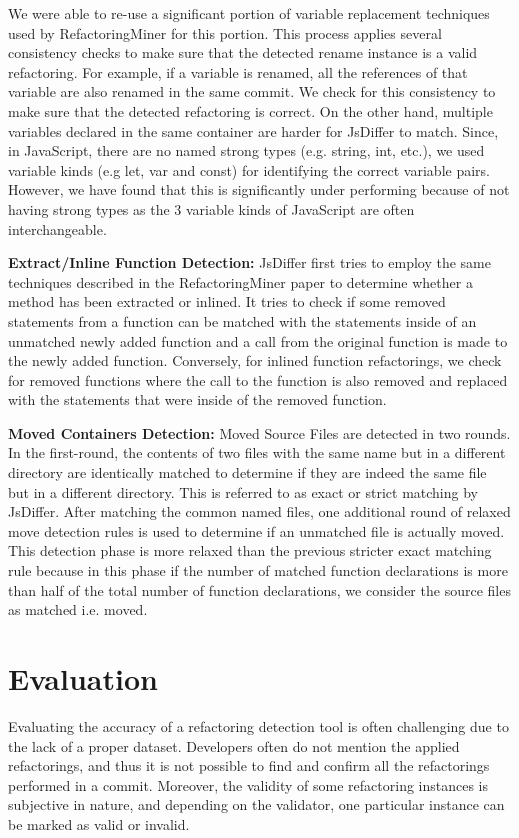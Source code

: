 \documentclass[letterpaper,12pt,onecolumn,final]{report}
\begin{document}
We were able to re-use a significant portion of variable replacement techniques used by RefactoringMiner for this portion. This process applies several consistency checks to make sure that the detected rename instance is a valid refactoring. For example, if a variable is renamed, all the references of that variable are also renamed in the same commit. We check for this consistency to make sure that the detected refactoring is correct. On the other hand, multiple variables declared in the same container are harder for JsDiffer to match. Since, in JavaScript, there are no named strong types (e.g. string, int, etc.), we used variable kinds (e.g let, var and const) for identifying the correct variable pairs. However, we have found that this is significantly under performing because of not having strong types as the 3 variable kinds of JavaScript are often interchangeable.

\textbf{Extract/Inline Function Detection:} JsDiffer first tries to employ the same techniques described in the RefactoringMiner paper to determine whether a method has been extracted or inlined. It tries to check if some removed statements from a function can be matched with the statements inside of an unmatched newly added function and a call from the original function is made to the newly added function. Conversely, for inlined function refactorings, we check for removed functions where the call to the function is also removed and replaced with the statements that were inside of the removed function.

\textbf{Moved Containers Detection:} Moved Source Files are detected in two rounds. In the first-round, the contents of two files with the same name but in a different directory are identically matched to determine if they are indeed the same file but in a different directory. This is referred to as exact or strict matching by JsDiffer. After matching the common named files, one additional round of relaxed move detection rules is used to determine if an unmatched file is actually moved. This detection phase is more relaxed than the previous stricter exact matching rule because in this phase if the number of matched function declarations is more than half of the total number of function declarations, we consider the source files as matched i.e. moved.

\chapter{Evaluation}

Evaluating the accuracy of a refactoring detection tool is often challenging due to the lack of a proper dataset. Developers often do not mention the applied refactorings, and thus it is not possible to find and confirm all the refactorings performed in a commit. Moreover, the validity of some refactoring instances is subjective in nature, and depending on the validator, one particular instance can be marked as valid or invalid.
\end{document}
